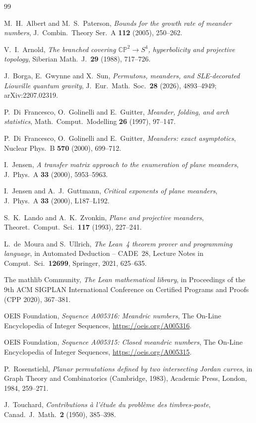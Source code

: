 \documentclass[11pt]{amsart}
\theoremstyle{definition}
\theoremstyle{remark}
\begin{document}
\begin{thebibliography}{99}

M.~H.~Albert and M.~S.~Paterson, \emph{Bounds for the growth rate of meander numbers},
J.~Combin.\ Theory Ser.~A \textbf{112} (2005), 250--262.

V.~I.~Arnold, \emph{The branched covering $\mathbb{CP}^2 \to S^4$, hyperbolicity and
projective topology}, Siberian Math.~J.\ \textbf{29} (1988), 717--726.

J.~Borga, E.~Gwynne and X.~Sun, \emph{Permutons, meanders, and SLE-decorated Liouville quantum
gravity}, J.~Eur.\ Math.\ Soc.\ \textbf{28} (2026), 4893--4949; arXiv:2207.02319.

P.~Di~Francesco, O.~Golinelli and E.~Guitter, \emph{Meander, folding, and arch statistics},
Math.\ Comput.\ Modelling \textbf{26} (1997), 97--147.

P.~Di~Francesco, O.~Golinelli and E.~Guitter, \emph{Meanders: exact asymptotics}, Nuclear
Phys.~B \textbf{570} (2000), 699--712.

I.~Jensen, \emph{A transfer matrix approach to the enumeration of plane meanders}, J.~Phys.~A
\textbf{33} (2000), 5953--5963.

I.~Jensen and A.~J.~Guttmann, \emph{Critical exponents of plane meanders}, J.~Phys.~A
\textbf{33} (2000), L187--L192.

S.~K.~Lando and A.~K.~Zvonkin, \emph{Plane and projective meanders}, Theoret.\ Comput.\ Sci.\
\textbf{117} (1993), 227--241.

L.~de~Moura and S.~Ullrich, \emph{The Lean~4 theorem prover and programming language}, in
Automated Deduction -- CADE~28, Lecture Notes in Comput.\ Sci.\ \textbf{12699}, Springer, 2021,
625--635.

The mathlib Community, \emph{The Lean mathematical library}, in Proceedings of the 9th ACM
SIGPLAN International Conference on Certified Programs and Proofs (CPP 2020), 367--381.

OEIS Foundation, \emph{Sequence A005316: Meandric numbers}, The On-Line Encyclopedia of
Integer Sequences, \url{https://oeis.org/A005316}.

OEIS Foundation, \emph{Sequence A005315: Closed meandric numbers}, The On-Line Encyclopedia of
Integer Sequences, \url{https://oeis.org/A005315}.

P.~Rosenstiehl, \emph{Planar permutations defined by two intersecting Jordan curves}, in Graph
Theory and Combinatorics (Cambridge, 1983), Academic Press, London, 1984, 259--271.

J.~Touchard, \emph{Contributions \`a l'\'etude du probl\`eme des timbres-poste}, Canad.\
J.~Math.\ \textbf{2} (1950), 385--398.

\end{thebibliography}
\end{document}
